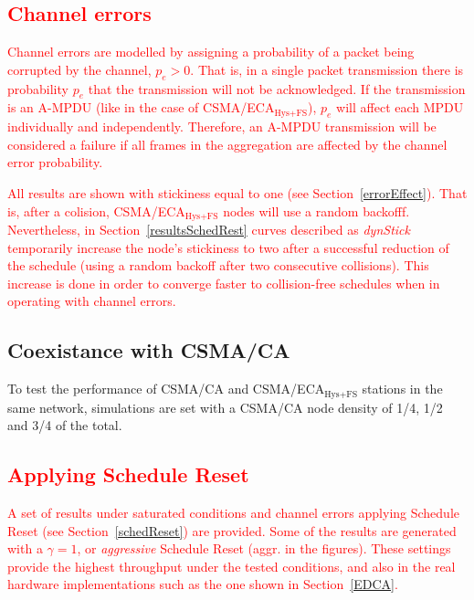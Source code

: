 	\textcolor{red}{\subsection{Channel errors}\label{channelErrorsDef}
	Channel errors are modelled by assigning a probability of a packet being corrupted by the channel, $p_e>0$. That is, in a single packet transmission there is probability $p_e$ that the transmission will not be acknowledged. If the transmission is an A-MPDU (like in the case of CSMA/ECA$_{\text{Hys+FS}}$), $p_e$ will affect each MPDU individually and independently. Therefore, an A-MPDU transmission will be considered a failure if all frames in the aggregation are affected by the channel error probability.}
	
	\textcolor{red}{All results are shown with stickiness equal to one (see Section~\ref{errorEffect}). That is, after a colision, CSMA/ECA$_{\text{Hys+FS}}$ nodes will use a random backofff. Nevertheless, in Section~\ref{resultsSchedRest} curves described as \emph{dynStick} temporarily increase the node's stickiness to two after a successful reduction of the schedule (using a random backoff after two consecutive collisions). This increase is done in order to converge faster to collision-free schedules when in operating with channel errors.}
	
	\subsection{Coexistance with CSMA/CA}\label{coexistence}
	To test the performance of CSMA/CA and CSMA/ECA$_{\text{Hys+FS}}$ stations in the same network, simulations are set with a CSMA/CA node density of 1/4, 1/2 and 3/4 of the total.
	
	\textcolor{red}{\subsection{Applying Schedule Reset} 
	A set of results under saturated conditions and channel errors applying Schedule Reset (see Section~\ref{schedReset}) are provided. Some of the results are generated with a $\gamma=1$, or \emph{aggressive} Schedule Reset (aggr. in the figures). These settings provide the highest throughput under the tested conditions, and also in the real hardware implementations such as the one shown in Section~\ref{EDCA}.
	}
